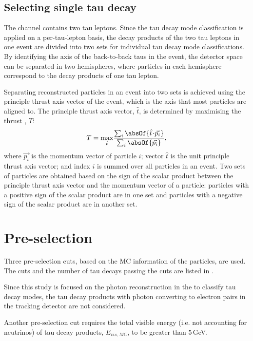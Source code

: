 \subsection{Selecting single tau decay}

The \eeToTauTau channel contains two tau leptons. Since the tau decay mode classification is applied on a per-tau-lepton basis, the decay products of the two tau leptons in one event are divided into two sets for individual tau decay mode classifications. By identifying the axis of the back-to-back taus in the  \eeToTauTau event, the detector space can be separated in two hemispheres, where particles in each hemisphere correspond to the decay products of one tau lepton.

Separating reconstructed particles in an event into two sets is achieved using the principle thrust axis vector of the event, which is the axis that most particles are aligned to. The principle thrust axis vector, $\hat{t}$, is determined by maximising the thrust \cite{PhysRevLett.39.1587}, $T$:
\begin{equation}
T = \max_{\hat{t}}\!\frac{\sum_{i}\absOf{\hat{t}\!\cdot\!\vec{p_{i}}}}{\sum_{i}\absOf{\vec{p_{i}}}},
\end{equation}
where $\vec{p_{i}}$ is the momentum vector of particle $i$;  vector $\hat{t}$ is the unit principle thrust axis vector; and index $i$ is summed over all particles in an event. Two sets of particles are obtained based on the sign of the scalar product between the principle thrust axis vector  and the momentum vector of a particle: particles with a positive sign of the scalar product are in one set and particles with a negative sign of the scalar product are in another set.


\section{Pre-selection}
\label{sec:tauPreSel}
Three pre-selection cuts, based on the MC information of the particles,  are used. The cuts and the number of tau decays passing the cuts are listed in .

Since this study is focused on the photon reconstruction in the \ECAL to classify tau decay modes, the tau decay products with photon converting to electron pairs in the tracking detector are not considered.

Another pre-selection cut requires the total visible energy (i.e. not accounting for neutrinos) of tau decay products, $E_{vis,MC}$, to be greater than 5\,GeV.

